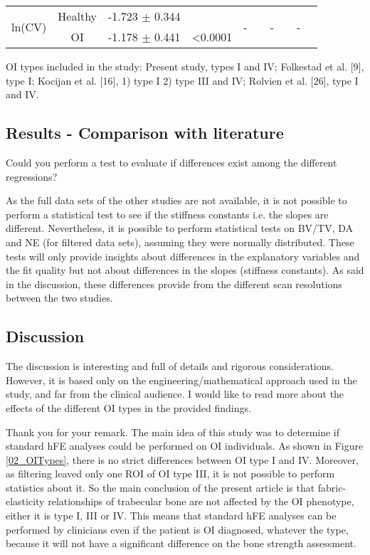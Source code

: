 \documentclass{AR2RC}
\begin{document}
\begin{sidewaystable*}
{\begin{tabular}{cccccccccc}
		\multirow{3}{*}{ln(CV)} & Healthy & -1.723 $\pm$ 0.344 & & \multirow{3}{*}{-} & & \multirow{3}{*}{-} & & \multirow{3}{*}{-} &  \\
		& \multirow{2}{*}{OI} & \multirow{2}{*}{-1.178 $\pm$ 0.441} & \multirow{2}{*}{<0.0001} & & & & & & \\
		& & & & & & & & & \\
		
		\bottomrule
	\end{tabular}}
	OI types included in the study: Present study, types I and IV; Folkestad et al. [9], type I; Kocijan et al. [16], 1) type I 2) type III and IV; Rolvien et al. [26], type I and IV.
\end{sidewaystable*}

\newpage
\subsection{Results - Comparison with literature}
\RC Could you perform a test to evaluate if differences exist among the different regressions?

\AR As the full data sets of the other studies are not available, it is not possible to perform a statistical test to see if the stiffness constants i.e. the slopes are different. Nevertheless, it is possible to perform statistical tests on BV/TV, DA and NE (for filtered data sets), assuming they were normally distributed. These tests will only provide insights about differences in the explanatory variables and the fit quality but not about differences in the slopes (stiffness constants). As said in the discussion, these differences provide from the different scan resolutions between the two studies.

\subsection{Discussion}
\RC The discussion is interesting and full of details and rigorous considerations. However, it is based only on the engineering/mathematical approach used in the study, and far from the clinical audience. I would like to read more about the effects of the different OI types in the provided findings.

\AR Thank you for your remark. The main idea of this study was to determine if standard hFE analyses could be performed on OI individuals. As shown in Figure \ref{02_OITypes}, there is no strict differences between OI type I and IV. Moreover, as filtering leaved only one ROI of OI type III, it is not possible to perform statistics about it. So the main conclusion of the present article is that fabric-elasticity relationships of trabecular bone are not affected by the OI phenotype, either it is type I, III or IV. This means that standard hFE analyses can be performed by clinicians even if the patient is OI diagnosed, whatever the type, because it will not have a significant difference on the bone strength assessment.
\end{document}
